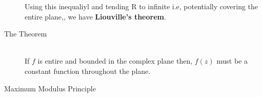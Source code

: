 \documentclass[11pt]{article}
\begin{document}
\begin{sloppypar}
\begin{description}
Using this inequaliyl and tending R to infinite i.e, potentially covering the entire plane,, we have \textbf{Liouville\rq{}s theorem}.

\item[The Theorem] \hfill \\
If $f$ is entire and bounded in the complex plane then, $f(z)$ must be a constant function throughout the plane.

\item[Maximum Modulus Principle] \hfill \\

\end{description}

\end{sloppypar}
\end{document}
